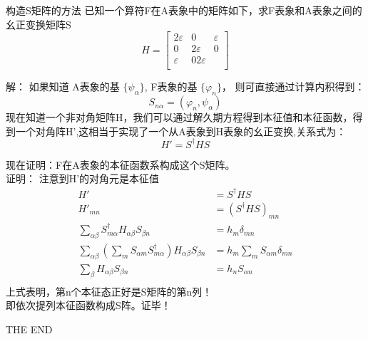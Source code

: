 \begin{frame}
    \begin{tcolorbox2}{构造S矩阵的方法}
        已知一个算符F在A表象中的矩阵如下，求F表象和A表象之间的幺正变换矩阵S
        $$ H=
        \begin{bmatrix}
            2\varepsilon  & 0 & \varepsilon\\
            0 & 2\varepsilon & 0 \\
            \varepsilon & 0 2\varepsilon\\
        \end{bmatrix} $$
     \end{tcolorbox2}
     \alert{解：} 如果知道 A表象的基 $\{\psi_\alpha \}$, F表象的基 $ \{\varphi_n \}$， 则可直接通过计算内积得到：
     $$ S_{n\alpha} =(\varphi_n, \psi_\alpha) $$
     现在知道一个非对角矩阵H，我们可以通过解久期方程得到本征值和本征函数，得到一个对角阵H',这相当于实现了一个从A表象到H表象的幺正变换,关系式为：
     $$ H'=S^\dagger H S$$
\end{frame}  

\begin{frame}
现在证明：F在A表象的本征函数系构成这个S矩阵。\\
\alert{证明：} 注意到H'的对角元是本征值
\begin{equation*}
    \begin{split}
    H' &=S^\dagger H S \\
    H'_{mn} &=(S^\dagger H S)_{mn}  \\
    \sum_{\alpha \beta} S^{\dagger} _{m \alpha} H_{\alpha \beta} S_{\beta n} & = h_m \delta_{mn} \\
    \sum_{\alpha \beta} (\sum_m S_{\alpha m} S^\dagger_{m \alpha}) H_{\alpha \beta} S_{\beta n} &= h_m \sum_m S_{\alpha m}\delta_{mn} \\
    \sum_{\beta} H_{\alpha \beta} S_{\beta n} &= h_n S_{\alpha n} \\
    \end{split} 
\end{equation*} 
上式表明，第n个本征态正好是S矩阵的第n列！\\
即依次提列本征函数构成S阵。证毕！
\end{frame} 

\begin{frame}
    THE END
\end{frame}  


 



